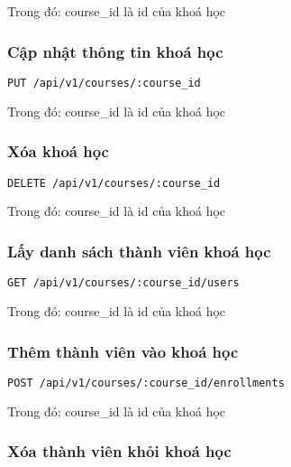 \documentclass[../Thesis.tex]{subfiles}
\begin{document}
            Trong đó: course\_id là id của khoá học

            \subsubsection{Cập nhật thông tin khoá học}
            \begin{lstlisting}[language=bash]
                PUT /api/v1/courses/:course_id
            \end{lstlisting}

            Trong đó: course\_id là id của khoá học

            \subsubsection{Xóa khoá học}
            \begin{lstlisting}[language=bash]
                DELETE /api/v1/courses/:course_id
            \end{lstlisting}

            Trong đó: course\_id là id của khoá học

            \subsubsection{Lấy danh sách thành viên khoá học}
            \begin{lstlisting}[language=bash]
                GET /api/v1/courses/:course_id/users
            \end{lstlisting}

            Trong đó: course\_id là id của khoá học

            \subsubsection{Thêm thành viên vào khoá học}

            \begin{lstlisting}[language=bash]
                POST /api/v1/courses/:course_id/enrollments
            \end{lstlisting}

            Trong đó: course\_id là id của khoá học

            \subsubsection{Xóa thành viên khỏi khoá học}
            
\end{document}

